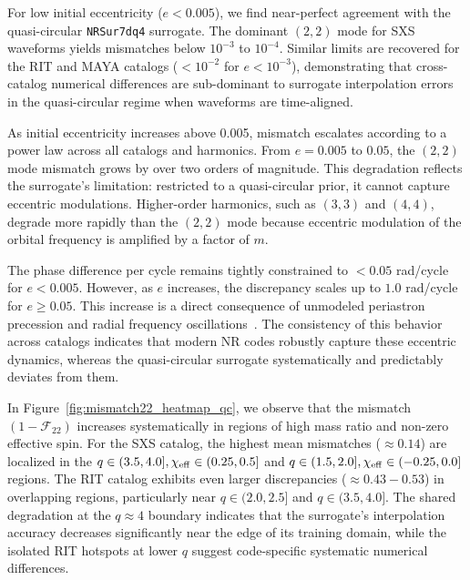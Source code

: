 \documentclass[%
 reprint,
superscriptaddress,
 amsmath,amssymb,
 aps,
]{revtex4-2}
\begin{document}
For low initial eccentricity ($e < 0.005$), we find near-perfect agreement with the quasi-circular \texttt{NRSur7dq4} surrogate. The dominant $(2,2)$ mode for SXS waveforms yields mismatches below $10^{-3}$ to $10^{-4}$. Similar limits are recovered for the RIT and MAYA catalogs ($< 10^{-2}$ for $e < 10^{-3}$), demonstrating that cross-catalog numerical differences are sub-dominant to surrogate interpolation errors in the quasi-circular regime when waveforms are time-aligned.

As initial eccentricity increases above 0.005, mismatch escalates according to a power law across all catalogs and harmonics. From $e=0.005$ to $0.05$, the $(2,2)$ mode mismatch grows by over two orders of magnitude. This degradation reflects the surrogate's limitation: restricted to a quasi-circular prior, it cannot capture eccentric modulations. Higher-order harmonics, such as $(3,3)$ and $(4,4)$, degrade more rapidly than the $(2,2)$ mode because eccentric modulation of the orbital frequency is amplified by a factor of $m$.

The phase difference per cycle remains tightly constrained to $< 0.05$ rad/cycle for $e < 0.005$. However, as $e$ increases, the discrepancy scales up to $1.0$ rad/cycle for $e \ge 0.05$. This increase is a direct consequence of unmodeled periastron precession and radial frequency oscillations~\cite{Peters:1963ux, Cho:2021oai, Huerta:2014eca, Huerta:2016rwp, Khalil:2023kep}. The consistency of this behavior across catalogs indicates that modern NR codes robustly capture these eccentric dynamics, whereas the quasi-circular surrogate systematically and predictably deviates from them.


In Figure~\ref{fig:mismatch22_heatmap_qc}, we observe that the mismatch $(1-\mathcal{F}_{22})$ increases systematically in regions of high mass ratio and non-zero effective spin. For the SXS catalog, the highest mean mismatches ($\approx 0.14$) are localized in the $q \in (3.5, 4.0], \chi_{\rm eff} \in (0.25, 0.5]$ and $q \in (1.5, 2.0], \chi_{\rm eff} \in (-0.25, 0.0]$ regions. The RIT catalog exhibits even larger discrepancies ($\approx 0.43 - 0.53$) in overlapping regions, particularly near $q \in (2.0, 2.5]$ and $q \in (3.5, 4.0]$. The shared degradation at the $q \approx 4$ boundary indicates that the surrogate's interpolation accuracy decreases significantly near the edge of its training domain, while the isolated RIT hotspots at lower $q$ suggest code-specific systematic numerical differences.
\end{document}
